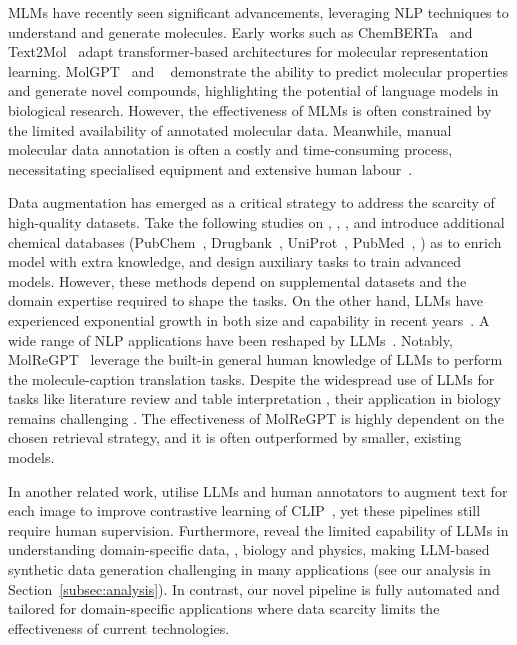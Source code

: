 MLMs have recently seen significant advancements, leveraging NLP techniques to understand and generate molecules. 
Early works such as ChemBERTa~\cite{CGR20} and Text2Mol~\cite{EZJ21} adapt transformer-based architectures for molecular representation learning. 
MolGPT~\cite{BAVP22} and \oldmodel~\cite{ELRHCJ22} demonstrate the ability to predict molecular properties and generate novel compounds, highlighting the potential of language models in biological research. 
% 
However, the effectiveness of MLMs is often constrained by the limited availability of annotated molecular data.
Meanwhile, manual molecular data annotation is often a costly and time-consuming process, necessitating specialised equipment and extensive human labour~\cite{DGH16}. 

Data augmentation has emerged as a critical strategy to address the scarcity of high-quality datasets.
% 
Take the following studies on \olddataset, \citet{CGBWLM23}, \citet{LZXWXQZL23}, \citet{PZZWGWXY23} and \citet{PWGLFZXQY24} introduce additional chemical databases (PubChem~\cite{KCCGHHLSTY23}, Drugbank~\cite{WFGLMGSJLS18}, UniProt~\cite{U23}, PubMed~\cite{W20}, \etc) as to enrich model with extra knowledge, and design auxiliary tasks to train advanced models. 
However, these methods depend on supplemental datasets and the domain expertise required to shape the tasks.
% 
On the other hand, LLMs have experienced exponential growth in both size and capability in recent years~\cite{BMRS20}. 
A wide range of NLP applications have been reshaped by LLMs~\cite{AMAV23,ZZM242}.
Notably, MolReGPT~\cite{LLFWLTL24} leverage the built-in general human knowledge of LLMs to perform the molecule-caption translation tasks. 
Despite the widespread use of LLMs for tasks like literature review and table interpretation \cite{AAAA23,TMSA23}, their application in biology remains challenging \cite{LJRHHNPWR24}. The effectiveness of MolReGPT is highly dependent on the chosen retrieval strategy, and it is often outperformed by smaller, existing models.
 
In another related work, \citet{WYHYMW24} utilise LLMs and human annotators to augment text for each image to improve contrastive learning of CLIP~\cite{RKHRGASAMCKS21}, yet these pipelines still require human supervision.
% 
Furthermore, \citet{ZZM24} reveal the limited capability of LLMs in understanding domain-specific data, \eg, biology and physics, making LLM-based synthetic data generation challenging in many applications (see our analysis in Section~\ref{subsec:analysis}). 
% 
In contrast, our novel \pipeline pipeline is fully automated and tailored for domain-specific applications where data scarcity limits the effectiveness of current technologies.
